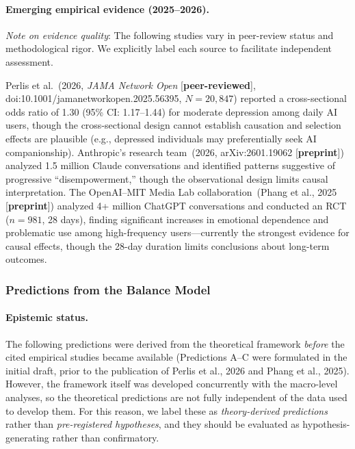 \documentclass[a4paper,11pt,titlepage]{article}
\begin{document}
\paragraph{Emerging empirical evidence (2025--2026).}
\textit{Note on evidence quality}: The following studies vary in peer-review status and methodological rigor. We explicitly label each source to facilitate independent assessment.

Perlis et al.~(2026, \textit{JAMA Network Open} [\textbf{peer-reviewed}], doi:10.1001/jamanetworkopen.2025.56395, $N = 20{,}847$) reported a cross-sectional odds ratio of 1.30 (95\% CI: 1.17--1.44) for moderate depression among daily AI users, though the cross-sectional design cannot establish causation and selection effects are plausible (e.g., depressed individuals may preferentially seek AI companionship). Anthropic's research team~(2026, arXiv:2601.19062 [\textbf{preprint}]) analyzed 1.5 million Claude conversations and identified patterns suggestive of progressive ``disempowerment,'' though the observational design limits causal interpretation. The OpenAI--MIT Media Lab collaboration~(Phang et al., 2025 [\textbf{preprint}]) analyzed 4+ million ChatGPT conversations and conducted an RCT ($n = 981$, 28 days), finding significant increases in emotional dependence and problematic use among high-frequency users---currently the strongest evidence for causal effects, though the 28-day duration limits conclusions about long-term outcomes.

\subsubsection{Predictions from the Balance Model}

\paragraph{Epistemic status.}
The following predictions were derived from the theoretical framework \emph{before} the cited empirical studies became available (Predictions A--C were formulated in the initial draft, prior to the publication of Perlis et al., 2026 and Phang et al., 2025). However, the framework itself was developed concurrently with the macro-level analyses, so the theoretical predictions are not fully independent of the data used to develop them. For this reason, we label these as \emph{theory-derived predictions} rather than \emph{pre-registered hypotheses}, and they should be evaluated as hypothesis-generating rather than confirmatory.
\end{document}
